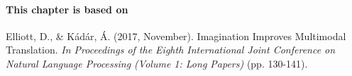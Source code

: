 
%
%






\newpage

\paragraph{This chapter is based on} Elliott, D., \& Kádár, Á. (2017, November).
 Imagination Improves Multimodal Translation. \textit{In Proceedings of the Eighth International Joint Conference on Natural Language Processing (Volume 1: Long Papers)} (pp. 130-141).

\newpage











%
%

%
